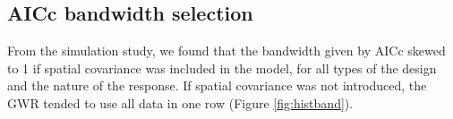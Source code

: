 \documentclass[a4paper]{article} 	%
\begin{document}

\subsection{AICc bandwidth selection}\label{Sec:bandselect}

From the simulation study, we found that the bandwidth given by AICc skewed to 1 if spatial covariance was included in the model, for all types of the design and the nature of the response. If spatial covariance was not introduced, the GWR tended to use all data in one row (Figure \ref{fig:histband}). 
\end{document}
